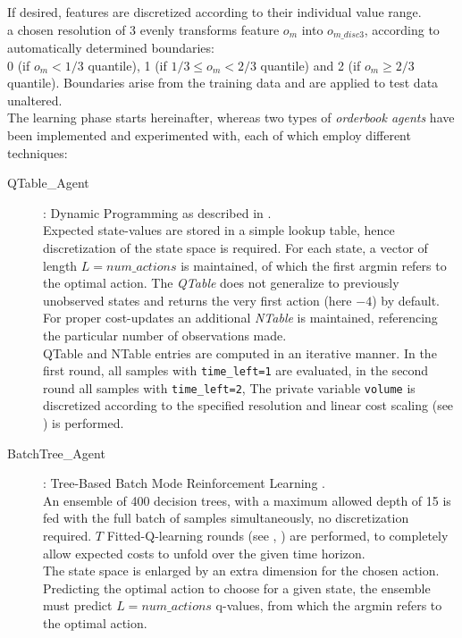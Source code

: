 If desired, features are discretized according to their individual value range.\\
\Eg a chosen resolution of 3 evenly transforms feature $o_m$ into $o_{m\_disc3}$, according to automatically determined boundaries: \\
0 (if $o_m< 1/3$ quantile), 1 (if $1/3 \leq o_m < 2/3$ quantile) and 2 (if $o_m \geq 2/3$ quantile). Boundaries arise from the training data and are applied to test data unaltered.\\

The learning phase starts hereinafter, whereas two types of \emph{orderbook agents} have been implemented and experimented with, each of which employ different techniques:

\begin{description}
\item[QTable\_Agent] : Dynamic Programming as described in .\\
Expected state-values are stored in a simple lookup table, hence discretization of the state space is required. For each state, a vector of length $L=num\_actions$ is maintained, of which the first argmin refers to the optimal action. The \emph{QTable} does not generalize to previously unobserved states and returns the very first action (here $-4$) by default. For proper cost-updates an additional \emph{NTable} is maintained, referencing the particular number of observations made.\\
QTable and NTable entries are computed in an iterative manner. In the first round, all samples with \lstinline!time_left=1! are evaluated, in the second round all samples with \lstinline!time_left=2!, \etc The private variable \lstinline!volume! is discretized according to the specified resolution and linear cost scaling (see ) is performed.

\item[BatchTree\_Agent]: Tree-Based Batch Mode Reinforcement Learning \Cite{Ernst:2005:TreeBasedBatchModeRL}.\\
An ensemble of 400 decision trees, with a maximum allowed depth of 15 is fed with the full batch of samples simultaneously, no discretization required. $T$ Fitted-Q-learning rounds (see , ) are performed, to completely allow expected costs to unfold over the given time horizon.\\
The state space is enlarged by an extra dimension for the chosen action. Predicting the optimal action to choose for a given state, the ensemble must predict $L=num\_actions$ q-values, from which the argmin refers to the optimal action.
\end{description}\bigskip

